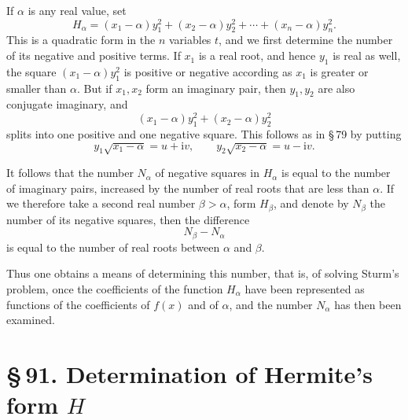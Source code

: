 \documentclass[11pt]{article}
\providecommand{\ii}{\mathrm{i}}
\providecommand{\sect}[2]{\section*{\S\,#1. #2}}
\begin{document}
If $\alpha$ is any real value, set
\begin{equation}
H_\alpha=(x_1-\alpha)y_1^2+(x_2-\alpha)y_2^2+\cdots+(x_n-\alpha)y_n^2.
\tag{5}
\end{equation}
This is a quadratic form in the $n$ variables $t$, and we first determine the number of its negative and positive terms. If $x_1$ is a real root, and hence $y_1$ is real as well, the square $(x_1-\alpha)y_1^2$ is positive or negative according as $x_1$ is greater or smaller than $\alpha$. But if $x_1,x_2$ form an imaginary pair, then $y_1,y_2$ are also conjugate imaginary, and
\[
        (x_1-\alpha)y_1^2+(x_2-\alpha)y_2^2
\]
splits into one positive and one negative square. This follows as in \S\,79 by putting
\[
        y_1\sqrt{x_1-\alpha}=u+\ii v,
        \qquad
        y_2\sqrt{x_2-\alpha}=u-\ii v.
\]

It follows that the number $N_\alpha$ of negative squares in $H_\alpha$ is equal to the number of imaginary pairs, increased by the number of real roots that are less than $\alpha$. If we therefore take a second real number $\beta>\alpha$, form $H_\beta$, and denote by $N_\beta$ the number of its negative squares, then the difference
\[
        N_\beta-N_\alpha
\]
is equal to the number of real roots between $\alpha$ and $\beta$.

Thus one obtains a means of determining this number, that is, of solving Sturm's problem, once the coefficients of the function $H_\alpha$ have been represented as functions of the coefficients of $f(x)$ and of $\alpha$, and the number $N_\alpha$ has then been examined.

\sect{91}{Determination of Hermite's form $H$}
\end{document}
